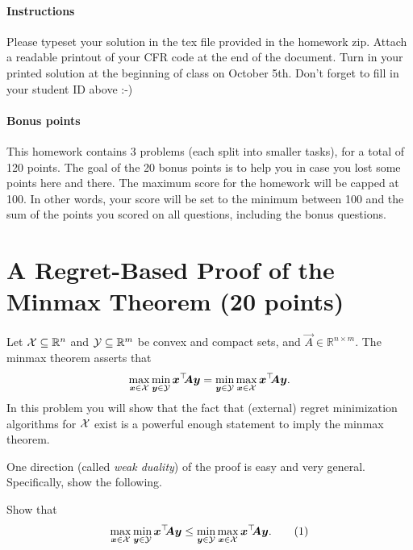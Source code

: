 \documentclass{homework}
\begin{document}
\maketitle

\paragraph{Instructions} Please typeset your solution in the tex file provided in the homework zip. Attach a readable printout of your CFR code at the end of the document. Turn in your printed solution at the beginning of class on October 5th. Don't forget to fill in your student ID above :-)

\paragraph{Bonus points} This homework contains 3 problems (each split into smaller tasks), for a total of 120 points. The goal of the 20 bonus points is to help you in case you lost some points here and there. The maximum score for the homework will be capped at 100. In other words, your score will be set to the minimum between 100 and the sum of the points you scored on all questions, including the bonus questions.

\section{A Regret-Based Proof of the Minmax Theorem (20 points)}

Let $\mathcal{X} \subseteq \mathbb{R}^n$ and $\mathcal{Y} \subseteq \mathbb{R}^m$ be convex and compact sets, and $\vec{A} \in \mathbb{R}^{n\times m}$. The minmax theorem asserts that
\[
    \max_{\bm{x}\in\mathcal{X}}\min_{\bm{y}\in\mathcal{Y}} \bm{x}^\top\!\! \bm{A} \bm{y} = \min_{\bm{y}\in\mathcal{Y}}\max_{\bm{x}\in\mathcal{X}} \bm{x}^\top\!\! \bm{A} \bm{y}.
\]
In this problem you will show that the fact that (external) regret minimization algorithms for
$\mathcal{X}$ exist is a powerful enough statement to imply the minmax theorem.

One direction (called \emph{weak duality}) of the proof is easy and very general. Specifically, show the following.

\begin{problem}[8 points]
    Show that
    \[
        \max_{\vec{x}\in\cX}\min_{\vec{y}\in\cY} \vec{x}^\top\!\! \vec{A} \vec{y} \le \min_{\vec{y}\in\cY}\max_{\vec{x}\in\cX} \vec{x}^\top\!\! \vec{A} \vec{y}.
        \numberthis{eq:weak duality}
    \]
\end{problem}
\begin{solution}
\end{solution}
\end{document}
